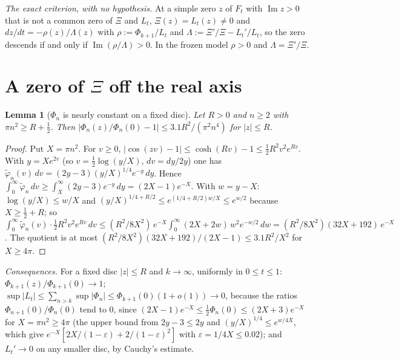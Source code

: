 \documentclass[11pt]{article}
\theoremstyle{plain}
\newtheorem{lemma}[theorem]{Lemma}
\theoremstyle{definition}
\theoremstyle{remark}
\newcommand{\im}{\operatorname{Im}}
\newcommand{\tphi}{\widetilde{\varphi}}
\begin{document}
\emph{The exact criterion, with no hypothesis.} At a simple zero $z$ of $F_t$
with $\im z > 0$ that is not a common zero of $\Xi$ and $L_t$,
$\Xi(z) = L_t(z) \ne 0$ and $dz/dt = -\rho(z)/\Lambda(z)$ with
$\rho := \Phi_{k+1}/L_t$ and $\Lambda := \Xi'/\Xi - L_t'/L_t$, so the zero
descends if and only if $\im(\rho/\Lambda) > 0$. In the frozen
model $\rho > 0$ and $\Lambda = \Xi'/\Xi$.

\section{A zero of \texorpdfstring{$\Xi$}{Xi} off the real axis}\label{sec:offaxis}

\begin{lemma}[$\Phi_n$ is nearly constant on a fixed disc]\label{lem:disc}
Let $R > 0$ and $n \ge 2$ with $\pi n^2 \ge R + \frac12$. Then
$|\Phi_n(z)/\Phi_n(0) - 1| \le 3.1R^2/(\pi^2 n^4)$ for $|z| \le R$.
\end{lemma}

\begin{proof}
Put $X = \pi n^2$. For $v \ge 0$,
$|\cos(zv) - 1| \le \cosh(Rv) - 1 \le \frac12 R^2v^2e^{Rv}$. With
$y = Xe^{2v}$ (so $v = \frac12\log(y/X)$, $dv = dy/2y$) one has
$\tphi_n(v)\,dv = (2y - 3)(y/X)^{1/4}e^{-y}\,dy$. Hence
$\int_0^\infty\tphi_n\,dv \ge \int_X^\infty(2y - 3)e^{-y}\,dy = (2X - 1)e^{-X}$.
With $w = y - X$: $\log(y/X) \le w/X$ and
$(y/X)^{1/4 + R/2} \le e^{(1/4 + R/2)w/X} \le e^{w/2}$ because
$X \ge \frac12 + R$; so
$\int_0^\infty\tphi_n(v)\cdot\frac12R^2v^2e^{Rv}\,dv
\le (R^2/8X^2)\,e^{-X}\int_0^\infty(2X + 2w)\,w^2e^{-w/2}\,dw
= (R^2/8X^2)(32X + 192)\,e^{-X}$. The quotient is at most
$(R^2/8X^2)(32X + 192)/(2X - 1) \le 3.1R^2/X^2$ for $X \ge 4\pi$.
\end{proof}

\emph{Consequences.} For a fixed disc $|z| \le R$ and $k \to \infty$, uniformly
in $0 \le t \le 1$: $\Phi_{k+1}(z)/\Phi_{k+1}(0) \to 1$;
$\sup|L_t| \le \sum_{n > k}\sup|\Phi_n| \le \Phi_{k+1}(0)(1 + o(1)) \to 0$,
because the ratios $\Phi_{n+1}(0)/\Phi_n(0)$ tend to $0$, since
$(2X - 1)e^{-X} \le \frac12\Phi_n(0) \le (2X + 3)e^{-X}$ for
$X = \pi n^2 \ge 4\pi$ (the upper bound from $2y - 3 \le 2y$ and
$(y/X)^{1/4} \le e^{w/4X}$, which give
$e^{-X}[2X/(1 - \varepsilon) + 2/(1 - \varepsilon)^2]$ with
$\varepsilon = 1/4X \le 0.02$); and $L_t' \to 0$ on any smaller disc, by
Cauchy's estimate.
\end{document}
